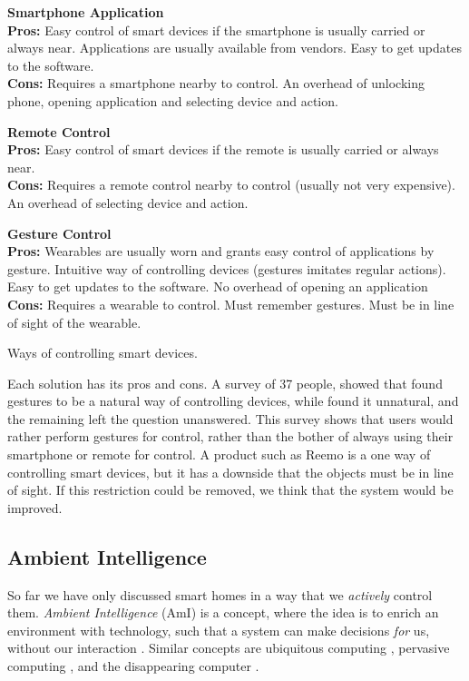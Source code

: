 \begin{table}[!htb]
    \centering
    \parbox[t][][t]{0.3\textwidth}{
        \textbf{Smartphone Application}\\
        \textbf{Pros:} Easy control of smart devices if the smartphone is usually carried or always near. 
                       Applications are usually available from vendors. 
                       Easy to get updates to the software. \\
        \textbf{Cons:} Requires a smartphone nearby to control. 
                       An overhead of unlocking phone, opening application and selecting device and action.
    }\quad
    \parbox[t][][t]{0.3\textwidth}{
        \textbf{Remote Control}\\
        \textbf{Pros:} Easy control of smart devices if the remote is usually carried or always near. \\
        \textbf{Cons:} Requires a remote control nearby to control (usually not very expensive). 
                       An overhead of selecting device and action.
    }\quad
    \parbox[t][][t]{0.3\textwidth}{
        \textbf{Gesture Control}\\
        \textbf{Pros:} Wearables are usually worn and grants easy control of applications by gesture.
                       Intuitive way of controlling devices (gestures imitates regular actions).
                       Easy to get updates to the software. 
                       No overhead of opening an application\\
        \textbf{Cons:} Requires a wearable to control. 
                       Must remember gestures.
                       Must be in line of sight of the wearable.
    }
    \caption{Ways of controlling smart devices.}
    \label{tbl:smartcontrol}
\end{table}

Each solution has its pros and cons. 
A survey \cite{Kela2006} of \num{37} people, 
showed that  found gestures to be a natural way of controlling devices, 
while  found it unnatural, 
and the remaining left the question unanswered. 
This survey shows that users would rather perform gestures for control, 
rather than the bother of always using their smartphone or remote for control.  
A product such as Reemo is a one way of controlling smart devices, 
but it has a downside that the objects must be in line of sight. 
If this restriction could be removed, 
we think that the system would be improved.

\subsection{Ambient Intelligence}
So far we have only discussed smart homes in a way that we \emph{actively} control them. 
\emph{Ambient Intelligence} (AmI) is a concept, 
where the idea is to enrich an environment with technology, 
such that a system can make decisions \emph{for} us, 
without our interaction \cite{augusto2007ambient}. 
Similar concepts are ubiquitous computing \cite{Weiser:237456}, pervasive computing \cite{Saha:2003:PCP:642243.642248}, 
and the disappearing computer \cite{Weiser:1999:CSC:329124.329126,Streitz:2005:1047671}. 


